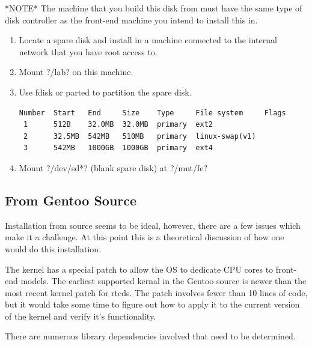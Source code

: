 *NOTE* The machine that you build this disk from must have the same type of disk controller as the front-end machine you intend to install this in.

\begin{enumerate}
    \item Locate a spare disk and install in a machine connected to the internal network that you have root access to.
    \item Mount \lstin?/lab? on this machine.
    \item Use fdisk or parted to partition the spare disk.
\begin{lstlisting}
Number  Start   End     Size    Type     File system     Flags
 1      512B    32.0MB  32.0MB  primary  ext2
 2      32.5MB  542MB   510MB   primary  linux-swap(v1)
 3      542MB   1000GB  1000GB  primary  ext4
\end{lstlisting}
    \item Mount \lstin?/dev/sd*? (blank spare disk) at \lstin?/mnt/fe?
\end{enumerate}

\subsection{From Gentoo Source}
Installation from source seems to be ideal, however, there are a few issues
which make it a challenge. At this point this is a theoretical discussion of
how one would do this installation.

The kernel has a special patch to allow the OS to dedicate CPU cores to
front-end models. The earliest supported kernal in the Gentoo source is newer
than the most recent kernel patch for rtcds. The patch involves fewer than 10
lines of code, but it would take some time to figure out how to apply it to
the current version of the kernel and verify it's functionality.

There are numerous library dependencies involved that need to be determined.


